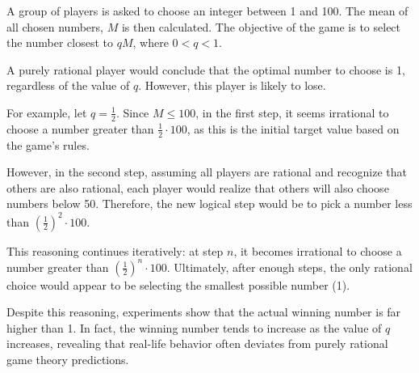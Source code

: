 \begin{example}
    A group of players is asked to choose an integer between 1 and 100.
    The mean of all chosen numbers, $M$ is then calculated. 
    The objective of the game is to select the number closest to $qM$, where $0 < q < 1$.

    A purely rational player would conclude that the optimal number to choose is 1, regardless of the value of $q$. 
    However, this player is likely to lose.

    For example, let $q = \frac{1}{2}$. 
    Since $M \leq 100$, in the first step, it seems irrational to choose a number greater than $\frac{1}{2} \cdot 100$, as this is the initial target value based on the game's rules.

    However, in the second step, assuming all players are rational and recognize that others are also rational, each player would realize that others will also choose numbers below 50. 
    Therefore, the new logical step would be to pick a number less than $\left( \frac{1}{2} \right)^2 \cdot 100$.


    This reasoning continues iteratively: at step $n$, it becomes irrational to choose a number greater than $\left( \frac{1}{2} \right)^n \cdot 100$.
    Ultimately, after enough steps, the only rational choice would appear to be selecting the smallest possible number (1).
    
    Despite this reasoning, experiments show that the actual winning number is far higher than 1. 
    In fact, the winning number tends to increase as the value of $q$ increases, revealing that real-life behavior often deviates from purely rational game theory predictions.
\end{example}